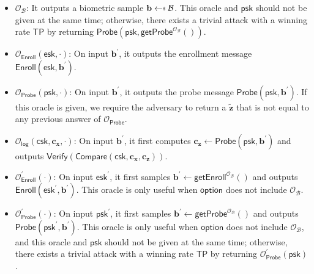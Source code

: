 \begin{itemize}

	\item $\mathcal{O}_{\mathcal{B}}$: It outputs a biometric sample $\mathbf{b} \getsdollar \mathcal{B}$. This oracle and $\textsf{psk}$ should not be given at the same time; otherwise, there exists a trivial attack with a winning rate $\textsf{TP}$ by returning $\textsf{Probe}(\textsf{psk}, \textsf{getProbe}^{ \mathcal{O}_\mathcal{B} }() )$.
	
	\item $\mathcal{O}_\textsf{Enroll}(\textsf{esk}, \cdot)$: On input $\mathbf{b}^\prime$, it outputs the enrollment message $\textsf{Enroll}(\textsf{esk}, \mathbf{b}^\prime)$.

	\item $\mathcal{O}_\textsf{Probe}(\textsf{psk}, \cdot)$: On input $\mathbf{b}^\prime$, it outputs the probe message $\textsf{Probe}(\textsf{psk}, \mathbf{b}^\prime)$. If this oracle is given, we require the adversary to return a $\mathbf{\tilde{z}}$ that is not equal to any previous answer of $\mathcal{O}_\textsf{Probe}$.
	
	\item $\mathcal{O}_\textsf{log}(\textsf{csk}, \mathbf{c_x}, \cdot)$: On input $\mathbf{b}^\prime$, it first computes $\mathbf{c_z} \gets \textsf{Probe}(\textsf{psk}, \mathbf{b}^\prime)$ and outputs $\textsf{Verify}(\textsf{Compare}(\textsf{csk}, \mathbf{c_x}, \mathbf{c_z} ) )$.
	
	\item $\mathcal{O}_\textsf{Enroll}^\prime (\cdot)$: On input $\textsf{esk}^\prime$, it first samples $\mathbf{b}^\prime \gets \textsf{getEnroll}^{\mathcal{O}_{\mathcal{B}}}()$ and outputs $\textsf{Enroll}(\textsf{esk}^\prime, \mathbf{b}^\prime)$. This oracle is only useful when $\textsf{option}$ does not include $\mathcal{O}_{\mathcal{B}}$.

	\item $\mathcal{O}_\textsf{Probe}^\prime (\cdot)$: On input $\textsf{psk}^\prime$, it first samples $\mathbf{b}^\prime \gets \textsf{getProbe}^{\mathcal{O}_{\mathcal{B}}}()$ and outputs $\textsf{Probe}(\textsf{psk}^\prime, \mathbf{b}^\prime)$. This oracle is only useful when $\textsf{option}$ does not include $\mathcal{O}_{\mathcal{B}}$, and this oracle and $\textsf{psk}$ should not be given at the same time; otherwise, there exists a trivial attack with a winning rate $\textsf{TP}$ by returning $\mathcal{O}_{\textsf{Probe}}^\prime (\textsf{psk})$.
	
\end{itemize}

